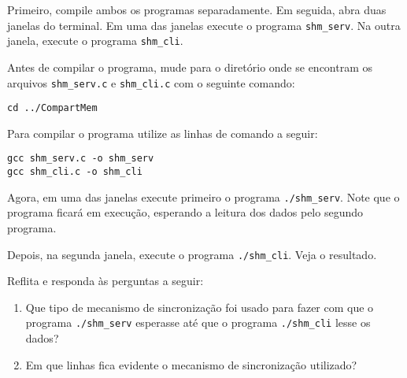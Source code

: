 Primeiro, compile ambos os programas separadamente. Em seguida, abra duas janelas do terminal. Em uma das janelas execute o programa  \texttt{shm\_serv}. Na outra janela, execute o programa \texttt{shm\_cli}.

Antes de compilar o programa, mude para o diretório onde se encontram os arquivos \texttt{shm\_serv.c} e \texttt{shm\_cli.c} com o seguinte comando:
\begin{lstlisting}[style=MyBashStyle]
cd ../CompartMem
\end{lstlisting}


Para compilar o programa utilize as linhas de comando a seguir:
\begin{lstlisting}[style=MyBashStyle]
gcc shm_serv.c -o shm_serv
gcc shm_cli.c -o shm_cli
\end{lstlisting}

Agora, em uma das janelas execute primeiro o programa \texttt{./shm\_serv}. Note que o programa ficará em execução, esperando a leitura dos dados pelo segundo programa.

Depois, na segunda janela, execute o programa \texttt{./shm\_cli}. Veja o resultado.

Reflita e responda às perguntas a seguir: 
\begin{enumerate}
    \item Que tipo de mecanismo de sincronização foi usado para fazer com que o programa \texttt{./shm\_serv} esperasse até que o programa \texttt{./shm\_cli} lesse os dados?
    \item Em que linhas fica evidente o mecanismo de sincronização utilizado?
\end{enumerate}
    
